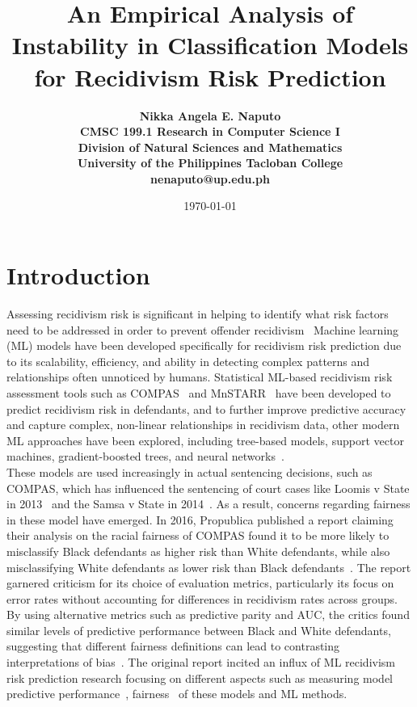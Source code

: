 \documentclass[12pt]{article}
\title{\bfseries An Empirical Analysis of Instability in Classification Models for Recidivism Risk Prediction}
\author{\bfseries 
  Nikka Angela E. Naputo\\
  CMSC 199.1 Research in Computer Science I\\
  Division of Natural Sciences and Mathematics\\
  University of the Philippines Tacloban College\\
  {\small nenaputo@up.edu.ph}
}
\date{\today}
\begin{document}
\sloppy %

\maketitle 
\newpage 

\tableofcontents 
\newpage

\section{Introduction} 
\tab Assessing recidivism risk is significant in helping to identify what risk factors need to be addressed in order to prevent offender recidivism~\cite{bonta2007risk, duwe2017out} Machine learning (ML) models have been developed specifically for recidivism risk prediction due to its scalability, efficiency, and ability in detecting complex patterns and relationships often unnoticed by humans. Statistical ML-based recidivism risk assessment tools such as COMPAS~\cite{northpointe2015practitioner} and MnSTARR~\cite{duwe2014development} have been developed to predict recidivism risk in defendants, and to further improve predictive accuracy and capture complex, non-linear relationships in recidivism data, other modern ML approaches have been explored, including tree-based models, support vector machines, gradient-boosted trees, and neural networks~\cite{duwe2017out}.\\

These models are used increasingly in actual sentencing decisions, such as COMPAS, which has influenced the sentencing of court cases like Loomis v State in 2013~\cite{loomis2016} and the Samsa v State in 2014~\cite{samsa2014}. As a result, concerns regarding fairness in these model have emerged. In 2016, Propublica published a report claiming their analysis on the racial fairness of COMPAS found it to be more likely to misclassify Black defendants as higher risk than White defendants, while also misclassifying White defendants as lower risk than Black defendants~\cite{propublica2016analysis}. The report garnered criticism for its choice of evaluation metrics, particularly its focus on error rates without accounting for differences in recidivism rates across groups. By using alternative metrics such as predictive parity and AUC, the critics found similar levels of predictive performance between Black and White defendants, suggesting that different fairness definitions can lead to contrasting interpretations of bias~\cite{dieterich2016compas,corbett2017algorithmic, flores2016false}. The original report incited an influx of ML recidivism risk prediction research focusing on different aspects such as measuring model predictive performance~\cite{duwe2017out, travaini2022machine, tollenaar2013method}, fairness~\cite{tolan2019machine,dressel2018accuracy,ngo2018traditional} of these models and ML methods.\\
\end{document}
